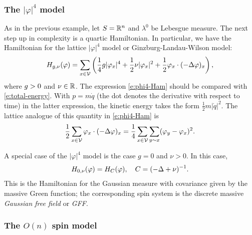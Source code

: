\subsubsection{The $|\varphi|^4$ model}

As in the previous example, let $S = {\mathbb R}^n$ and $\lambda^0$ be Lebesgue measure.
The next step up in complexity is a quartic Hamiltonian. In particular, we have
the Hamiltonian for the lattice $|\varphi|^4$ model or Ginzburg-Landau-Wilson model:
\begin{equation}
\label{e:phi4-Ham}
H_{g,\nu}(\varphi)
  =
\sum_{x\in\mathcal{V}}
\left(
  \frac{1}{4} g |\varphi_x|^4
    +
  \frac{1}{2} \nu |\varphi_x|^2
    +
  \frac{1}{2} \varphi_x \cdot (-\Delta \varphi)_x
\right),
\end{equation}
where $g > 0$ and $\nu\in{\mathbb R}$.
The expression \eqref{e:phi4-Ham} should be compared with \eqref{e:total-energy}.
With $p = m \dot q$ (the dot denotes the derivative with respect to time) in the latter
expression, the kinetic energy takes the form
$\tfrac12 m |\dot q|^2$. The lattice analogue of this quantity in \eqref{e:phi4-Ham} is
\begin{equation}
\frac12 \sum_{x\in\mathcal{V}} \varphi_x \cdot (-\Delta \varphi)_x
	=
\frac14 \sum_{x\in\mathcal{V}} \sum_{y\sim x} (\varphi_y - \varphi_x)^2.
\end{equation}

\begin{example}
A special case of the $|\varphi|^4$ model is the case $g = 0$ and $\nu > 0$.
In this case,
\begin{equation}
H_{0,\nu}(\varphi) = H_C(\varphi),
	\quad
C = (-\Delta + \nu)^{-1}.
\end{equation}
This is the Hamiltonian for the Gaussian measure with covariance given by the massive
Green function; the corresponding spin system is the discrete massive \emph{Gaussian free
field} or \emph{GFF}.
\end{example}

\subsubsection{The $O(n)$ spin model}


